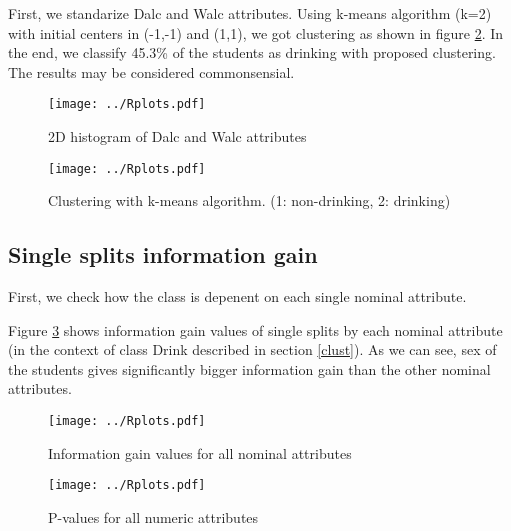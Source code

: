 \documentclass[a4paper]{article}
\begin{document}
\begin{multicols}{2}
First, we standarize Dalc and Walc attributes.
Using k-means algorithm (k=2) with initial centers in (-1,-1) and (1,1), we got clustering as shown in figure \ref{fig:clust}.
In the end, we classify 45.3\% of the students as drinking with proposed clustering.
The results may be considered commonsensial.



\begin{figure}[H]
    \centering
    \texttt{[image: ../Rplots.pdf]}
    \label{fig:hist2D}
    \caption[]{2D histogram of Dalc and Walc attributes}
\end{figure}

\begin{figure}[H]
    \centering
    \texttt{[image: ../Rplots.pdf]}
    \label{fig:clust}
    \caption[]{Clustering with k-means algorithm. (1: non-drinking, 2: drinking)}
\end{figure}

\subsection{Single splits information gain}
\label{xent}
First, we check how the class is depenent on each single nominal attribute.

Figure \ref{fig:nominalIG} shows information gain values
of single splits by each nominal attribute (in the context of class Drink described in section \ref{clust}).
As we can see, sex of the students gives significantly bigger information gain
than the other nominal attributes.

% 

\begin{figure}[H]
    \centering
    \texttt{[image: ../Rplots.pdf]}
    \caption[]{Information gain values for all nominal attributes
    \label{fig:nominalIG}
    }
\end{figure}

\begin{figure}[H]
    \centering
    \texttt{[image: ../Rplots.pdf]}
    \caption[]{P-values for all numeric attributes
    \label{fig:pval}
    }
\end{figure}



\end{multicols}
\end{document}
